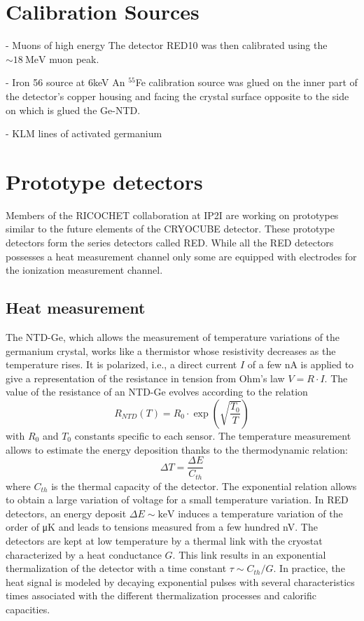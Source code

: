 \section{Calibration Sources}

- Muons of high energy
The detector RED10 was then calibrated using the $\sim \SI{18}{\mega\eV}$ muon peak. 

- Iron 56 source at 6keV
An $^{55}$Fe calibration source was glued on the inner part of the detector's copper housing and facing the crystal surface opposite to the side on which is glued the Ge-NTD.

- KLM lines of activated germanium



\section{Prototype detectors}

Members of the RICOCHET collaboration at IP2I are working on prototypes similar to the future elements of the CRYOCUBE detector. These prototype detectors form the series detectors called RED. While all the RED detectors possesses a heat measurement channel only some are equipped with electrodes for the ionization measurement channel. 


\subsection{Heat measurement}

The NTD-Ge, which allows the measurement of temperature variations of the germanium crystal, works like a thermistor whose resistivity decreases as the temperature rises. It is polarized, i.e., a direct current $I$ of a few \si{\nano\ampere} is applied to give a representation of the resistance in tension from Ohm's law $V = R \cdot I$. The value  of the resistance of an NTD-Ge evolves according to the relation
\begin{equation}
\label{eq:ntd-resistivity}
R_{NTD}(T) = R_0 \cdot \exp(\sqrt{\frac{T_0}{T}})
\end{equation}
with $R_0$ and $T_0$ constants specific to each sensor. The temperature measurement allows to estimate the energy deposition thanks to the thermodynamic relation:
\begin{equation}
\Delta T = \frac{\Delta E}{C_{th}}
\end{equation}
where $C_{th}$ is the thermal capacity of the detector. The exponential relation allows to obtain a large variation of voltage for a small temperature variation. In RED detectors, an energy deposit $\Delta E \sim \si{\kilo\eV}$ induces a temperature variation of the order of \si{\micro\kelvin} and leads to tensions measured from a few hundred \si{\nano\volt}. The detectors are kept at low temperature by a thermal link with the cryostat characterized by a heat conductance $G$. This link results in an exponential thermalization of the detector with a time constant $\tau \sim C_{th}/G$. In practice, the heat signal is modeled by decaying exponential pulses with several characteristics times associated with the different thermalization processes and calorific capacities.


